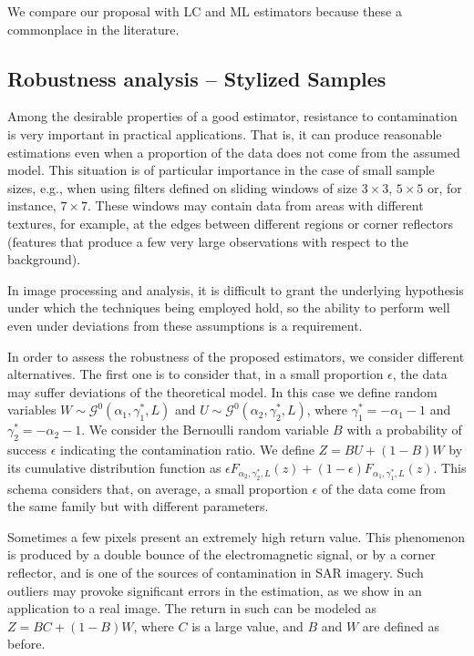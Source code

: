\documentclass[twocolumn]{svjour3}
\begin{document}
	We compare our proposal with LC and ML estimators because these a commonplace in the literature.
	
	\subsection{Robustness analysis -- Stylized Samples}
	\label{robustez}
	Among the desirable properties of a good estimator, resistance to contamination is very important in practical applications. 
	That is, it can produce reasonable estimations even when a proportion of the data does not come from the assumed model. 
	This situation is of particular importance in the case of small sample sizes, e.g., when using filters defined on sliding windows of size $3 \times 3$, $5 \times 5$ or, for instance, $7 \times 7$. 
	These windows may contain data from areas with different textures, for example, at the edges between different regions or corner reflectors (features that produce a few very large observations with respect to the background).
	
	In image processing and analysis, it is difficult to grant the underlying hypothesis under which the techniques being employed hold, so the ability to perform well even under deviations from these assumptions is a requirement.
	
	In order to assess the robustness of the proposed estimators, we consider different alternatives. 
	The first one is to consider that, in a small proportion $\epsilon$, the data may suffer deviations of the theoretical model. 
	In this case we define random variables $W \sim \mathcal{G}^0(\alpha_1,\gamma_1^*,L)$ and $U \sim \mathcal{G}^0(\alpha_2,\gamma_2^*,L)$, where $\gamma_1^*=-\alpha_1-1$ and  $\gamma_2^*=-\alpha_2-1$. 
	We consider the Bernoulli random variable $B$ with a probability of success $\epsilon$ indicating the contamination ratio.   
	We define $Z=BU+(1-B)W$ by its cumulative distribution function as
	$
	\epsilon {F}_{\alpha_2,\gamma_2^*,L}(z)+(1-\epsilon) {F}_{\alpha_1,\gamma_1^*,L}(z)
	$.
	This schema considers that, on average, a small proportion $\epsilon$ of the data come from the same family but with different parameters. 
	
	Sometimes a few pixels present an extremely high return value. 
	This phenomenon is produced by a double bounce of the electromagnetic signal, or by a corner reflector, and is one of the sources of contamination in SAR imagery. 
	Such outliers may provoke significant errors in the estimation, as we show in an application to a real image. 
	The return in such can be modeled as $Z=BC+(1-B)W$, where $C$ is a large value, and $B$ and $W$ are defined as before.
	
\end{document}
